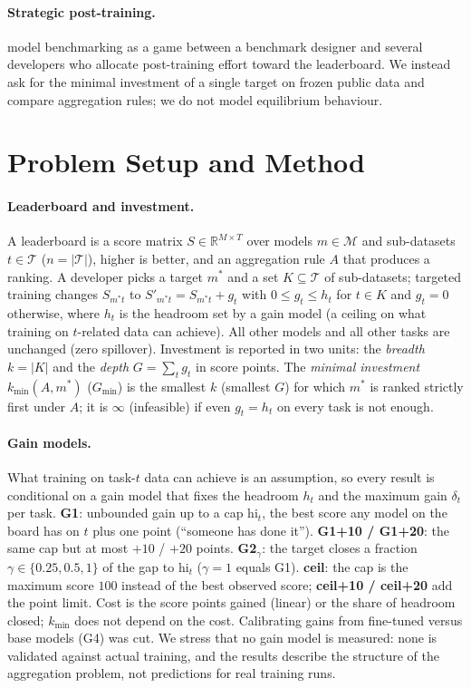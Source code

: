 \documentclass{article}
\begin{document}
\paragraph{Strategic post-training.} \citet{chen2026incentives} model benchmarking as a game between a benchmark designer and several developers who allocate post-training effort toward the leaderboard. We instead ask for the minimal investment of a single target on frozen public data and compare aggregation rules; we do not model equilibrium behaviour.

\section{Problem Setup and Method}
\label{sec:method}
\paragraph{Leaderboard and investment.}
A leaderboard is a score matrix $S\in\mathbb{R}^{M\times T}$ over models $m\in\mathcal M$ and sub-datasets $t\in\mathcal T$ ($n=|\mathcal T|$), higher is better, and an aggregation rule $A$ that produces a ranking.
A developer picks a target $m^\ast$ and a set $K\subseteq\mathcal T$ of sub-datasets; targeted training changes $S_{m^\ast t}$ to $S'_{m^\ast t}=S_{m^\ast t}+g_t$ with $0\le g_t\le h_t$ for $t\in K$ and $g_t=0$ otherwise, where $h_t$ is the headroom set by a gain model (a ceiling on what training on $t$-related data can achieve).
All other models and all other tasks are unchanged (zero spillover).
Investment is reported in two units: the \emph{breadth} $k=|K|$ and the \emph{depth} $G=\sum_t g_t$ in score points.
The \emph{minimal investment} $k_{\min}(A,m^\ast)$ ($G_{\min}$) is the smallest $k$ (smallest $G$) for which $m^\ast$ is ranked strictly first under $A$; it is $\infty$ (infeasible) if even $g_t=h_t$ on every task is not enough.

\paragraph{Gain models.}
What training on task-$t$ data can achieve is an assumption, so every result is conditional on a gain model that fixes the headroom $h_t$ and the maximum gain $\delta_t$ per task.
\textbf{G1}: unbounded gain up to a cap $\mathrm{hi}_t$, the best score any model on the board has on $t$ plus one point (``someone has done it''). \textbf{G1+10 / G1+20}: the same cap but at most $+10$ / $+20$ points. \textbf{G2$_\gamma$}: the target closes a fraction $\gamma\in\{0.25,0.5,1\}$ of the gap to $\mathrm{hi}_t$ ($\gamma=1$ equals G1). \textbf{ceil}: the cap is the maximum score $100$ instead of the best observed score; \textbf{ceil+10 / ceil+20} add the point limit.
Cost is the score points gained (linear) or the share of headroom closed; $k_{\min}$ does not depend on the cost.
Calibrating gains from fine-tuned versus base models (G4) was cut.
We stress that no gain model is measured: none is validated against actual training, and the results describe the structure of the aggregation problem, not predictions for real training runs.
\end{document}
